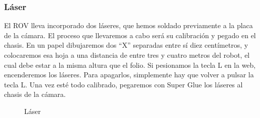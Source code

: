   \subsubsection{Láser}
  \label{subsubsec:laser}
El ROV lleva incorporado dos láseres, que hemos soldado previamente a la placa de la cámara. El proceso que llevaremos a cabo será su calibración y pegado en el chasis.
En un papel dibujaremos dos “X” separadas entre sí diez centímetros, y colocaremos esa hoja a una distancia de entre tres y cuatro metros del robot, el cual debe estar a la misma altura que el folio.
Si pesionamos la tecla L en la web, encenderemos los láseres. Para apagarlos, simplemente hay que volver a pulsar la tecla L.
Una vez esté todo calibrado, pegaremos con Super Glue los láseres al chasis de la cámara.
 \begin{figure}[hbtp]
  \begin{center}
  \end{center}
  \caption{Láser}
  \label{fig:laser}
\end{figure}

\newpage
